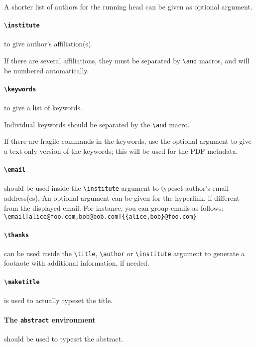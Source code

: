\documentclass[preprint]{iacrtrans}
\begin{document}
A shorter list of authors for the running head can be given as
optional argument.

\paragraph{\texttt{\textbackslash institute}} to give author's affiliation(s).

If there are several affiliations, they must be separated by
\verb+\and+ macros, and will be numbered automatically.

\paragraph{\texttt{\textbackslash keywords}} to give a list of
keywords.

Individual keywords should be separated by the \verb+\and+ macro.

If there are fragile commands in the keywords, use the optional argument
to give a text-only version of the keywords; this will be used for the
PDF metadata.

\paragraph{\texttt{\textbackslash email}} should be used inside the
\verb+\institute+ argument to typeset author's email address(es).  An
optional argument can be given for the hyperlink, if different from the
displayed email.  For instance, you can group emails as follows:\\
\verb+\email[alice@foo.com,bob@bob.com]{{alice,bob}@foo.com}+

\paragraph{\texttt{\textbackslash thanks}}
can be used inside the \verb+\title+,
\verb+\author+ or \verb+\institute+ argument to generate a footnote with additional
information, if needed.

\paragraph{\texttt{\textbackslash maketitle}} is used to actually
typeset the title.

\paragraph{The \texttt{abstract} environment} should be used to typeset the abstract.
\end{document}
